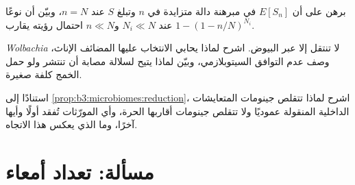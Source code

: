 \begin{exercise}[$\star\star\star$]\label{exo:b3:microbiomes:10}
برهن على أن $E[S_{n}]$ في مبرهنة  دالة متزايدة في
$n$ وتبلغ $S$ عند $n = N$، وبيّن أن نوعًا عند
$N_{i} \ll N$ و$n \ll N$ احتمال رؤيته يقارب
$1 - (1 - n/N)^{N_{i}}$.
\end{exercise}

\begin{exercise}[$\star\star\star$]\label{exo:b3:microbiomes:11}
\emph{Wolbachia} لا تنتقل إلا عبر البيوض. اشرح لماذا يحابي
الانتخاب عليها المضائف الإناث، وصف عدم التوافق
السيتوبلازمي، وبيّن لماذا يتيح لسلالة مصابة أن تنتشر ولو
حمل الخمج كلفة صغيرة.
\end{exercise}

\begin{exercise}[$\star\star\star$]\label{exo:b3:microbiomes:12}
استنادًا إلى \cref{prop:b3:microbiomes:reduction}، اشرح لماذا
تتقلص جينومات المتعايشات الداخلية المنقولة عموديًا ولا
تتقلص جينومات أقاربها الحرة، وأي المورّثات تُفقد أولًا
وأيها آخرًا، وما الذي يعكس هذا الاتجاه.
\end{exercise}

\section{مسألة: تعداد أمعاء}


